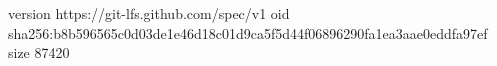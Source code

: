 version https://git-lfs.github.com/spec/v1
oid sha256:b8b596565c0d03de1e46d18c01d9ca5f5d44f06896290fa1ea3aae0eddfa97ef
size 87420
